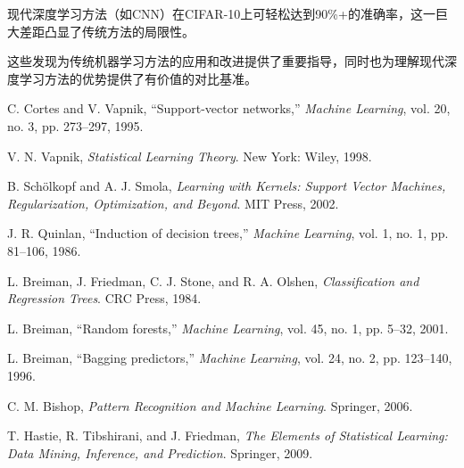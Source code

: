 \documentclass[UTF8]{report}
\theoremstyle{MyLineTheoremStyle} %
\theoremstyle{MyBlockTheoremStyle} %
\theoremstyle{MySubsubsectionStyle} %
\begin{document}
现代深度学习方法（如CNN）在CIFAR-10上可轻松达到90\%+的准确率，这一巨大差距凸显了传统方法的局限性。


这些发现为传统机器学习方法的应用和改进提供了重要指导，同时也为理解现代深度学习方法的优势提供了有价值的对比基准。


\begin{thebibliography}{99}

C. Cortes and V. Vapnik, ``Support-vector networks,'' \textit{Machine Learning}, vol. 20, no. 3, pp. 273--297, 1995.

V. N. Vapnik, \textit{Statistical Learning Theory}. New York: Wiley, 1998.

B. Schölkopf and A. J. Smola, \textit{Learning with Kernels: Support Vector Machines, Regularization, Optimization, and Beyond}. MIT Press, 2002.

J. R. Quinlan, ``Induction of decision trees,'' \textit{Machine Learning}, vol. 1, no. 1, pp. 81--106, 1986.

L. Breiman, J. Friedman, C. J. Stone, and R. A. Olshen, \textit{Classification and Regression Trees}. CRC Press, 1984.

L. Breiman, ``Random forests,'' \textit{Machine Learning}, vol. 45, no. 1, pp. 5--32, 2001.

L. Breiman, ``Bagging predictors,'' \textit{Machine Learning}, vol. 24, no. 2, pp. 123--140, 1996.

C. M. Bishop, \textit{Pattern Recognition and Machine Learning}. Springer, 2006.

T. Hastie, R. Tibshirani, and J. Friedman, \textit{The Elements of Statistical Learning: Data Mining, Inference, and Prediction}. Springer, 2009.

\end{thebibliography}
\end{document}
